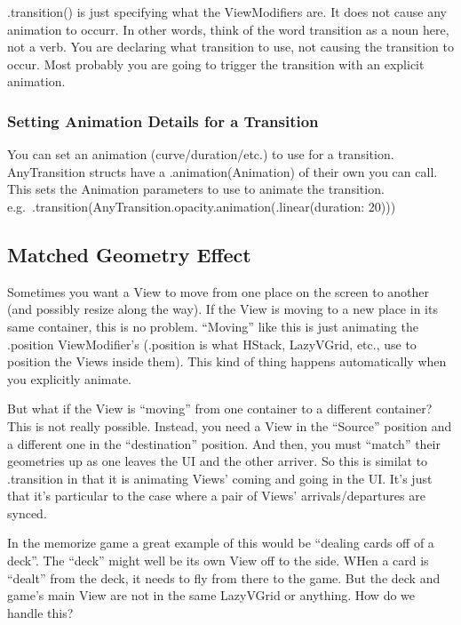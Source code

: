 \documentclass[]{article}
\begin{document}
.transition() is just specifying what the ViewModifiers are. It does not
cause any animation to occurr. In other words, think of the word
transition as a noun here, not a verb. You are declaring what transition
to use, not causing the transition to occur. Most probably you are going
to trigger the transition with an explicit animation.

\hypertarget{setting-animation-details-for-a-transition}{%
\subsubsection{Setting Animation Details for a
Transition}\label{setting-animation-details-for-a-transition}}

You can set an animation (curve/duration/etc.) to use for a transition.
AnyTransition structs have a .animation(Animation) of their own you can
call. This sets the Animation parameters to use to animate the
transition.
e.g.~.transition(AnyTransition.opacity.animation(.linear(duration: 20)))

\hypertarget{matched-geometry-effect}{%
\subsection{Matched Geometry Effect}\label{matched-geometry-effect}}

Sometimes you want a View to move from one place on the screen to
another (and possibly resize along the way). If the View is moving to a
new place in its same container, this is no problem. ``Moving'' like
this is just animating the .position ViewModifier's (.position is what
HStack, LazyVGrid, etc., use to position the Views inside them). This
kind of thing happens automatically when you explicitly animate.

But what if the View is ``moving'' from one container to a different
container? This is not really possible. Instead, you need a View in the
``Source'' position and a different one in the ``destination'' position.
And then, you must ``match'' their geometries up as one leaves the UI
and the other arriver. So this is similat to .transition in that it is
animating Views' coming and going in the UI. It's just that it's
particular to the case where a pair of Views' arrivals/departures are
synced.

In the memorize game a great example of this would be ``dealing cards
off of a deck''. The ``deck'' might well be its own View off to the
side. WHen a card is ``dealt'' from the deck, it needs to fly from there
to the game. But the deck and game's main View are not in the same
LazyVGrid or anything. How do we handle this?
\end{document}
